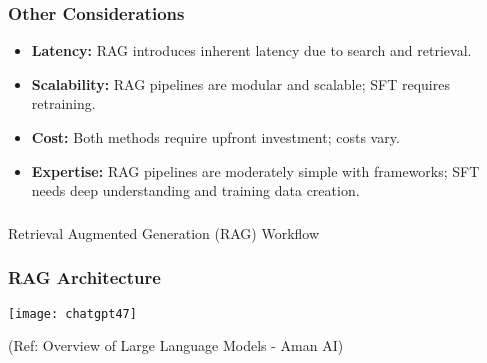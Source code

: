 \begin{frame}[fragile]\frametitle{Other Considerations}
\begin{itemize}
  \item \textbf{Latency:} RAG introduces inherent latency due to search and retrieval.
  \item \textbf{Scalability:} RAG pipelines are modular and scalable; SFT requires retraining.
  \item \textbf{Cost:} Both methods require upfront investment; costs vary.
  \item \textbf{Expertise:} RAG pipelines are moderately simple with frameworks; SFT needs deep understanding and training data creation.
\end{itemize}
\end{frame}





\begin{frame}[fragile]\frametitle{}
\begin{center}
{\Large Retrieval Augmented Generation (RAG) Workflow}
\end{center}
\end{frame}


\begin{frame}[fragile]\frametitle{RAG Architecture}


		\begin{center}
		\texttt{[image: chatgpt47]}
		\end{center}

{\tiny (Ref: Overview of Large Language Models - Aman AI)}

\end{frame}


